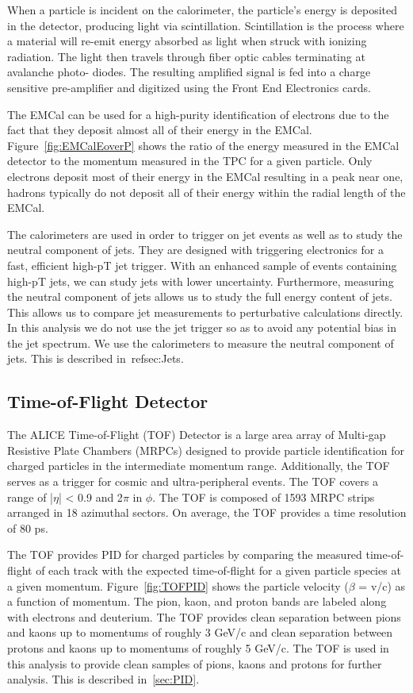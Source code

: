 When a particle is incident on the calorimeter, the particle’s energy is deposited in the detector, producing light via scintillation. Scintillation is the process where a material will re-emit energy absorbed as light when struck with ionizing radiation. The light then travels through fiber optic cables terminating at avalanche photo- diodes. The resulting amplified signal is fed into a charge sensitive pre-amplifier and digitized using the Front End Electronics cards.

The EMCal can be used for a high-purity identification of electrons due to the fact that they deposit almost all of their energy in the EMCal. Figure~\ref{fig:EMCalEoverP} shows the ratio of the energy measured in the EMCal detector to the momentum measured in the TPC for a given particle. Only electrons deposit most of their energy in the EMCal resulting in a peak near one, hadrons typically do not deposit all of their energy within the radial length of the EMCal.

The calorimeters are used in order to trigger on jet events as well as to study the neutral component of jets. They are designed with triggering electronics for a fast, efficient high-pT jet trigger. With an enhanced sample of events containing high-pT jets, we can study jets with lower uncertainty. Furthermore, measuring the neutral component of jets allows us to study the full energy content of jets. This allows us to compare jet measurements to perturbative calculations directly. In this analysis we do not use the jet trigger so as to avoid any potential bias in the jet spectrum. We use the calorimeters to measure the neutral component of jets. This is described in~ref{sec:Jets}.

\subsection*{Time-of-Flight Detector}\label{subsec:TOF}

The ALICE Time-of-Flight (TOF) Detector is a large area array of Multi-gap Resistive Plate Chambers (MRPCs) designed to provide particle identification for charged particles in the intermediate momentum range. Additionally, the TOF serves as a trigger for cosmic and ultra-peripheral events. The TOF covers a range of |$\eta$| < 0.9 and 2$\pi$ in $\phi$. The TOF is composed of 1593 MRPC strips arranged in 18 azimuthal sectors. On average, the TOF provides a time resolution of 80 ps.

The TOF provides PID for charged particles by comparing the measured time-of-flight of each track with the expected time-of-flight for a given particle species at a given momentum. Figure~\ref{fig:TOFPID} shows the particle velocity ($\beta$ = v/c) as a function of momentum. The pion, kaon, and proton bands are labeled along with electrons and deuterium. The TOF provides clean separation between pions and kaons up to momentums of roughly 3 GeV/c and clean separation between protons and kaons up to momentums of roughly 5 GeV/c. The TOF is used in this analysis to provide clean samples of pions, kaons and protons for further analysis. This is described in~\ref{sec:PID}. 

